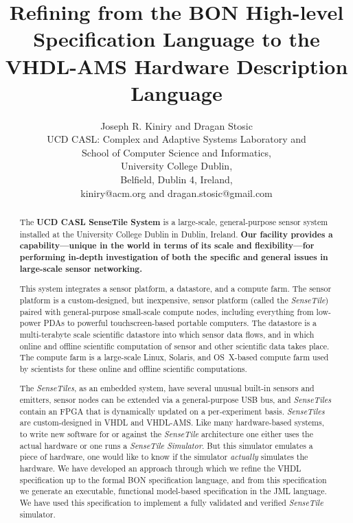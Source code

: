 \documentclass{article}
\newcommand{\ST}{\emph{SenseTile}\xspace}
\newcommand{\STs}{\emph{SenseTiles}\xspace}
\newcommand{\STS}{\emph{SenseTile Simulator}\xspace}
\begin{document}
\title{Refining from the BON High-level Specification Language to the
  VHDL-AMS Hardware Description Language}

\author{Joseph R. Kiniry and Dragan Stosic\\
UCD CASL: Complex and Adaptive Systems Laboratory and\\
School of Computer Science and Informatics,\\
University College Dublin,\\
Belfield, Dublin 4, Ireland,\\
kiniry@acm.org and dragan.stosic@gmail.com\\
}

\maketitle

\begin{abstract}
  
The \textbf{UCD CASL SenseTile System} is a large-scale, general-purpose
sensor system installed at the University College Dublin in Dublin,
Ireland.  \textbf{Our facility provides a capability---unique in the world in
terms of its scale and flexibility---for performing in-depth
investigation of both the specific and general issues in large-scale
sensor networking.}

This system integrates a sensor platform, a datastore, and a compute
farm.  The sensor platform is a custom-designed, but inexpensive,
sensor platform (called the \ST) paired with general-purpose
small-scale compute nodes, including everything from low-power PDAs to
powerful touchscreen-based portable computers.  The datastore is a
multi-terabyte scale scientific datastore into which sensor data
flows, and in which online and offline scientific computation of
sensor and other scientific data takes place.  The compute farm is a
large-scale Linux, Solaris, and OS~X-based compute farm used by
scientists for these online and offline scientific computations.

The \STs, as an embedded system, have several unusual built-in sensors 
and emitters, sensor nodes can be extended via a general-purpose USB bus, 
and \STs contain an FPGA that is dynamically updated on a per-experiment 
basis.  \STs are custom-designed in VHDL and VHDL-AMS.  Like many hardware-based systems,
 to write new software for or against the \ST architecture one either uses
the actual hardware or one runs a \STS.  But this simulator emulates a
piece of hardware, one would like to know if the simulator
\emph{actually} simulates the hardware.  We have developed an approach
through which we refine the VHDL specification up to the formal BON
specification language, and from this specification we generate an
executable, functional model-based specification in the JML language.
We have used this specification to implement a fully validated and
verified \ST simulator.

\end{abstract}
\end{document}

